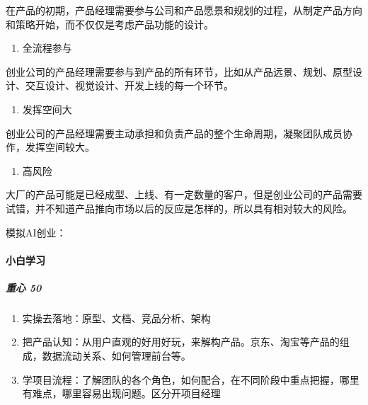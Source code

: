 \documentclass[letterpaper,11pt,english]{sphinxmanual}
\begin{document}
在产品的初期，产品经理需要参与公司和产品愿景和规划的过程，从制定产品方向和策略开始，而不仅仅是考虑产品功能的设计。
\begin{enumerate}
%
\setcounter{enumi}{1}
\item {} 
全流程参与

\end{enumerate}

创业公司的产品经理需要参与到产品的所有环节，比如从产品远景、规划、原型设计、交互设计、视觉设计、开发上线的每一个环节。
\begin{enumerate}
%
\setcounter{enumi}{2}
\item {} 
发挥空间大

\end{enumerate}

创业公司的产品经理需要主动承担和负责产品的整个生命周期，凝聚团队成员协作，发挥空间较大。
\begin{enumerate}
%
\setcounter{enumi}{3}
\item {} 
高风险

\end{enumerate}

大厂的产品可能是已经成型、上线、有一定数量的客户，但是创业公司的产品需要试错，并不知道产品推向市场以后的反应是怎样的，所以具有相对较大的风险。

模拟AI创业：


\paragraph{小白学习}
\label{\detokenize{chapter_introduction/PM:id44}}

\subparagraph{重心 50\sphinxfootnotemark[157]}
\label{\detokenize{chapter_introduction/PM:id45}}%
\begin{footnotetext}[157]\sphinxAtStartFootnote
{}
%
\end{footnotetext}\ignorespaces \begin{enumerate}
%
\item {} 
实操去落地：原型、文档、竞品分析、架构

\item {} 
把产品认知：从用户直观的好用好玩，来解构产品。京东、淘宝等产品的组成，数据流动关系、如何管理前台等。

\item {} 
学项目流程：了解团队的各个角色，如何配合，在不同阶段中重点把握，哪里有难点，哪里容易出现问题。区分开项目经理

\end{enumerate}
\end{document}
